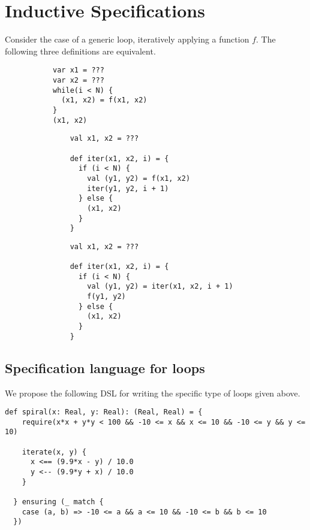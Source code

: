\section{Inductive Specifications}

Consider the case of a generic loop, iteratively applying a function $f$.
The following three definitions are equivalent.
\begin{figure}[h!]
  \centering
  \lstset{numbers=none}
  \begin{subfigure}[b]{0.25\textwidth}
    \begin{lstlisting}
var x1 = ???
var x2 = ???
while(i < N) {
  (x1, x2) = f(x1, x2)
}
(x1, x2)
    \end{lstlisting}
    \caption{}
  \end{subfigure}%
  \begin{subfigure}[b]{0.32\textwidth}
    \begin{lstlisting}
    val x1, x2 = ???

    def iter(x1, x2, i) = {
      if (i < N) {
        val (y1, y2) = f(x1, x2)
        iter(y1, y2, i + 1)
      } else {
        (x1, x2)
      }
    }
    \end{lstlisting}
    \caption{}
  \end{subfigure}
  \begin{subfigure}[b]{0.32\textwidth}
    \begin{lstlisting}
    val x1, x2 = ???

    def iter(x1, x2, i) = {
      if (i < N) {
        val (y1, y2) = iter(x1, x2, i + 1)
        f(y1, y2)
      } else {
        (x1, x2)
      }
    }
    \end{lstlisting}
    \caption{}
  \end{subfigure}
\end{figure}

\subsection{Specification language for loops}
We propose the following DSL for writing the specific type of loops given above.
\begin{lstlisting}
def spiral(x: Real, y: Real): (Real, Real) = {
    require(x*x + y*y < 100 && -10 <= x && x <= 10 && -10 <= y && y <= 10)

    iterate(x, y) {
      x <== (9.9*x - y) / 10.0
      y <-- (9.9*y + x) / 10.0
    }

  } ensuring (_ match {
    case (a, b) => -10 <= a && a <= 10 && -10 <= b && b <= 10
  })
\end{lstlisting}

